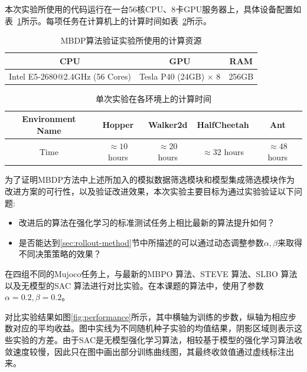 本次实验所使用的代码运行在一台56核CPU、8卡GPU服务器上，具体设备配置如表~\ref{tab:computing-resources}所示。每项任务在计算机上的计算时间如表~\ref{tab:run-time}所示。

\begin{table}
\centering
\begin{tabular}{c|c|c}
\toprule[2pt]
CPU                      & GPU                         & RAM   \\
\midrule[1pt]
Intel E5-2680@2.4GHz (56 Cores) & Tesla P40 (24GB) $\times$ 8 & 256GB\\
\bottomrule[2pt]
\end{tabular}
\caption{MBDP算法验证实验所使用的计算资源}
\label{tab:computing-resources}
\end{table}

\begin{table}
\centering
\begin{tabular}{c|c|c|c|c}
\toprule[2pt]
Environment Name  & Hopper      & Walker2d    & HalfCheetah & Ant         \\
\midrule[1pt]
Time & $\approx 10$ hours & $\approx 20$ hours & $\approx 32$ hours & $\approx 48$ hours \\
\bottomrule[2pt]
\end{tabular}
\caption{单次实验在各环境上的计算时间}
\label{tab:run-time}
\end{table}

为了证明MBDP方法中上述所加入的模拟数据筛选模块和模型集成筛选模块作为改进方案的可行性，以及验证改进效果，本次实验主要目标为通过实验验证以下问题:

\begin{itemize}
    \item 改进后的算法在强化学习的标准测试任务上相比最新的算法提升如何？
    \item 是否能达到\ref{sec:rollout-method}节中所描述的可以通过动态调整参数$\alpha,\beta$来取得不同决策策略的效果？
\end{itemize}

在四组不同的Mujoco任务上，与最新的MBPO \cite{janner2019trust}算法、STEVE \cite{buckman2018sample}算法、SLBO \cite{Luo2019AlgorithmicGuarantees}算法以及无模型的SAC \cite{haarnoja2018soft}算法进行对比实验。在本课题的算法中，使用了参数$\alpha=0.2, \beta=0.2$。

对比实验结果如图\ref{fig:performance}所示，其中横轴为训练的步数，纵轴为相应步数对应的平均收益。图中实线为不同随机种子实验的均值结果，阴影区域则表示这些实验的方差。由于SAC是无模型强化学习算法，相较基于模型的强化学习算法收敛速度较慢，因此只在图中画出部分训练曲线图，其最终收敛值通过虚线标注出来。

